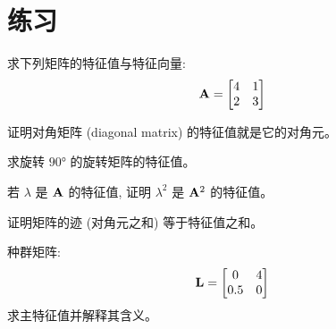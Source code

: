 \section{练习}

\begin{exercise}
求下列矩阵的特征值与特征向量:
\[
\mathbf{A} = \begin{bmatrix} 4 & 1 \\ 2 & 3 \end{bmatrix}
\]
\end{exercise}

\begin{exercise}
证明对角矩阵 (diagonal matrix) 的特征值就是它的对角元。
\end{exercise}

\begin{exercise}
求旋转 $90°$ 的旋转矩阵的特征值。
\end{exercise}

\begin{exercise}
若 $\lambda$ 是 $\mathbf{A}$ 的特征值, 证明 $\lambda^2$ 是 $\mathbf{A}^2$ 的特征值。
\end{exercise}

\begin{exercise}[挑战]
证明矩阵的迹 (对角元之和) 等于特征值之和。
\end{exercise}

\begin{problem}
种群矩阵:
\[
\mathbf{L} = \begin{bmatrix} 0 & 4 \\ 0.5 & 0 \end{bmatrix}
\]
求主特征值并解释其含义。
\end{problem}
